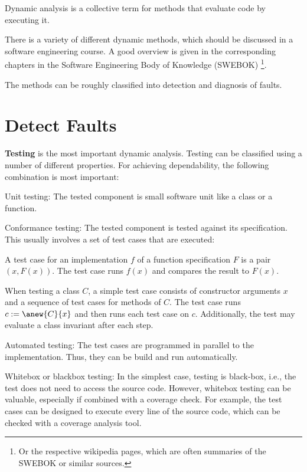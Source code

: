 Dynamic analysis is a collective term for methods that evaluate code by executing it.

There is a variety of different dynamic methods, which should be discussed in a software engineering course.
A good overview is given in the corresponding chapters in the Software Engineering Body of Knowledge (SWEBOK) \cite{swebok}\footnote{Or the respective wikipedia pages, which are often summaries of the SWEBOK or similar sources.}.

The methods can be roughly classified into detection and diagnosis of faults.

\section{Detect Faults}

\textbf{Testing} is the most important dynamic analysis.
Testing can be classified using a number of different properties.
For achieving dependability, the following combination is most important:
\begin{compactitem}
 \item Unit testing: The tested component is small software unit like a class or a function.
 \item Conformance testing: The tested component is tested against its specification.
 This usually involves a set of test cases that are executed:
  \begin{compactitem}
   \item A test case for an implementation $f$ of a function specification $F$ is a pair $(x,F(x))$.
   The test case runs $f(x)$ and compares the result to $F(x)$.
   \item When testing a class $C$, a simple test case consists of constructor arguments $x$ and a sequence of test cases for methods of $C$.
   The test case runs $c:=\anew{C}{x}$ and then runs each test case on $c$.
   Additionally, the test may evaluate a class invariant after each step.
  \end{compactitem}
 \item Automated testing: The test cases are programmed in parallel to the implementation.
 Thus, they can be build and run automatically.
 \item Whitebox or blackbox testing: In the simplest case, testing is black-box, i.e., the test does not need to access the source code.
 However, whitebox testing can be valuable, especially if combined with a coverage check.
 For example, the test cases can be designed to execute every line of the source code, which can be checked with a coverage analysis tool.
\end{compactitem}
\medskip

